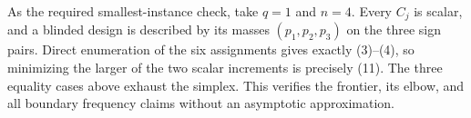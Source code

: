 As the required smallest-instance check, take \(q=1\) and \(n=4\). Every \(C_j\) is scalar, and a blinded design is described by its masses \((p_1,p_2,p_3)\) on the three sign pairs. Direct enumeration of the six assignments gives exactly (3)--(4), so minimizing the larger of the two scalar increments is precisely (11). The three equality cases above exhaust the simplex. This verifies the frontier, its elbow, and all boundary frequency claims without an asymptotic approximation.